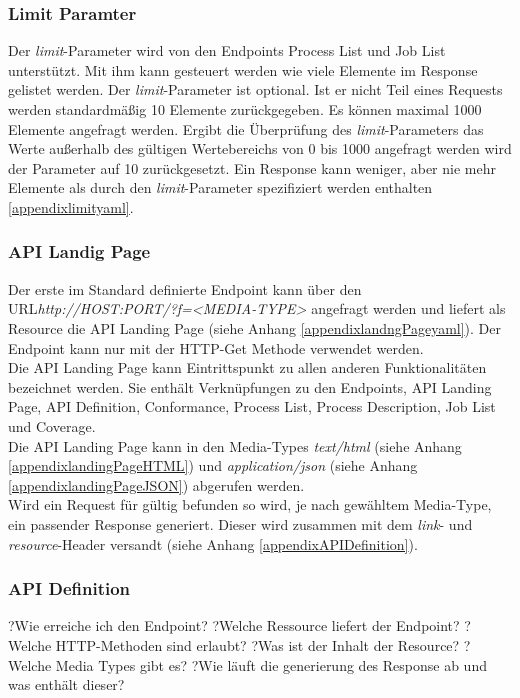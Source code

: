 \subsubsection{Limit Paramter}
Der \textit{limit}-Parameter wird von den Endpoints Process List und Job List unterstützt. Mit ihm kann gesteuert werden wie viele Elemente im Response gelistet werden. 
Der \textit{limit}-Parameter ist optional. Ist er nicht Teil eines Requests werden standardmäßig 10 Elemente zurückgegeben. Es können maximal 1000 Elemente angefragt werden.
Ergibt die Überprüfung des \textit{limit}-Parameters das Werte außerhalb des gültigen Wertebereichs von 0 bis 1000 angefragt werden wird der Parameter auf 10 zurückgesetzt. 
Ein Response kann weniger, aber nie mehr Elemente als durch den \textit{limit}-Parameter spezifiziert werden enthalten \ref{appendixlimityaml}. 

\subsubsection{API Landig Page}
Der erste im Standard definierte Endpoint kann über den URL\textit{http://HOST:PORT/?f=<MEDIA-TYPE>} angefragt werden und liefert als Resource die 
API Landing Page (siehe Anhang \ref{appendixlandngPageyaml}). 
Der Endpoint kann nur mit der HTTP-Get Methode verwendet werden. \\ 
Die API Landing Page kann Eintrittspunkt zu allen anderen Funktionalitäten bezeichnet werden. Sie enthält Verknüpfungen zu den Endpoints, API Landing Page, API Definition, 
Conformance, Process List, Process Description, Job List und Coverage.\\
Die API Landing Page kann in den Media-Types \textit{text/html} (siehe Anhang \ref{appendixlandingPageHTML}) und \textit{application/json} 
(siehe Anhang \ref{appendixlandingPageJSON}) abgerufen werden.\\
 
Wird ein Request für gültig befunden so wird, je nach gewähltem Media-Type, ein passender Response generiert. 
Dieser wird zusammen mit dem \textit{link}- und \textit{resource}-Header versandt (siehe Anhang \ref{appendixAPIDefinition}). 

\subsubsection{API Definition}
?Wie erreiche ich den Endpoint?
?Welche Ressource liefert der Endpoint?
?Welche HTTP-Methoden sind erlaubt?
?Was ist der Inhalt der Resource?
?Welche Media Types gibt es?
?Wie läuft die generierung des Response ab und was enthält dieser?
